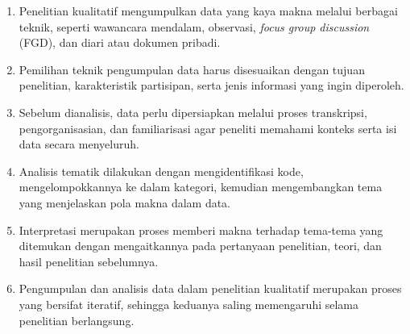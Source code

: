 \documentclass[
  indonesian,
  letterpaper,
  DIV=11,
  numbers=noendperiod]{scrreprt}
\providecommand{\tightlist}{%
  \setlength{\itemsep}{0pt}\setlength{\parskip}{0pt}}
\begin{document}
\begin{tcolorbox}[enhanced jigsaw, colframe=quarto-callout-tip-color-frame, toptitle=1mm, breakable, leftrule=.75mm, arc=.35mm, toprule=.15mm, colback=white, colbacktitle=quarto-callout-tip-color!10!white, bottomtitle=1mm, bottomrule=.15mm, titlerule=0mm, title=\textcolor{quarto-callout-tip-color}{\faLightbulb}\hspace{0.5em}{Rangkuman}, coltitle=black, left=2mm, opacitybacktitle=0.6, opacityback=0, rightrule=.15mm]

\begin{enumerate}
\def\labelenumi{\arabic{enumi}.}
\tightlist
\item
  Penelitian kualitatif mengumpulkan data yang kaya makna melalui
  berbagai teknik, seperti wawancara mendalam, observasi, \emph{focus
  group discussion} (FGD), dan diari atau dokumen pribadi.
\item
  Pemilihan teknik pengumpulan data harus disesuaikan dengan tujuan
  penelitian, karakteristik partisipan, serta jenis informasi yang ingin
  diperoleh.
\item
  Sebelum dianalisis, data perlu dipersiapkan melalui proses
  transkripsi, pengorganisasian, dan familiarisasi agar peneliti
  memahami konteks serta isi data secara menyeluruh.
\item
  Analisis tematik dilakukan dengan mengidentifikasi kode,
  mengelompokkannya ke dalam kategori, kemudian mengembangkan tema yang
  menjelaskan pola makna dalam data.
\item
  Interpretasi merupakan proses memberi makna terhadap tema-tema yang
  ditemukan dengan mengaitkannya pada pertanyaan penelitian, teori, dan
  hasil penelitian sebelumnya.
\item
  Pengumpulan dan analisis data dalam penelitian kualitatif merupakan
  proses yang bersifat iteratif, sehingga keduanya saling memengaruhi
  selama penelitian berlangsung.
\end{enumerate}

\end{tcolorbox}
\end{document}
